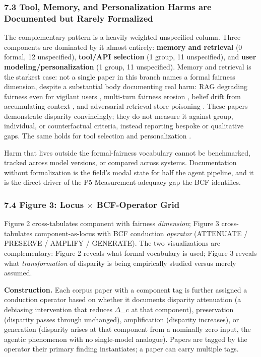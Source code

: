 \documentclass[10pt]{article}
\begin{document}
\subsubsection*{7.3 Tool, Memory, and Personalization Harms are Documented but Rarely Formalized}

The complementary pattern is a heavily weighted unspecified column. Three components are dominated by it almost entirely: \textbf{memory and retrieval} (0 formal, 12 unspecified), \textbf{tool/API selection} (1 group, 11 unspecified), and \textbf{user modeling/personalization} (1 group, 11 unspecified). Memory and retrieval is the starkest case: not a single paper in this branch names a formal fairness dimension, despite a substantial body documenting real harm: RAG degrading fairness even for vigilant users \cite{hu2024free}, multi-turn fairness erosion \cite{fan2024fairmt}, belief drift from accumulating context \cite{geng2025accumulating,simhi2026old}, and adversarial retrieval-store poisoning \cite{wang2025bias}. These papers demonstrate disparity convincingly; they do not measure it against group, individual, or counterfactual criteria, instead reporting bespoke or qualitative gaps. The same holds for tool selection \cite{blankenstein2025biasbusters,sneh2025tooltweak} and personalization \cite{kantharuban2024stereotype,pawar2025presumed,mire2025rejected,tonneau2026different}.

Harm that lives outside the formal-fairness vocabulary cannot be benchmarked, tracked across model versions, or compared across systems. Documentation without formalization is the field's modal state for half the agent pipeline, and it is the direct driver of the P5 Measurement-adequacy gap the BCF identifies.

\subsubsection*{7.4 Figure 3: Locus $\times$ BCF-Operator Grid}

Figure 2 cross-tabulates component with fairness \emph{dimension}; Figure 3 cross-tabulates component-as-locus with BCF conduction \emph{operator} (ATTENUATE / PRESERVE / AMPLIFY / GENERATE). The two visualizations are complementary: Figure 2 reveals what formal vocabulary is used; Figure 3 reveals what \emph{transformation} of disparity is being empirically studied versus merely assumed.

\textbf{Construction.} Each corpus paper with a component tag is further assigned a conduction operator based on whether it documents disparity attenuation (a debiasing intervention that reduces $\Delta$\_c at that component), preservation (disparity passes through unchanged), amplification (disparity increases), or generation (disparity arises at that component from a nominally zero input, the agentic phenomenon with no single-model analogue). Papers are tagged by the operator their primary finding instantiates; a paper can carry multiple tags.
\end{document}
